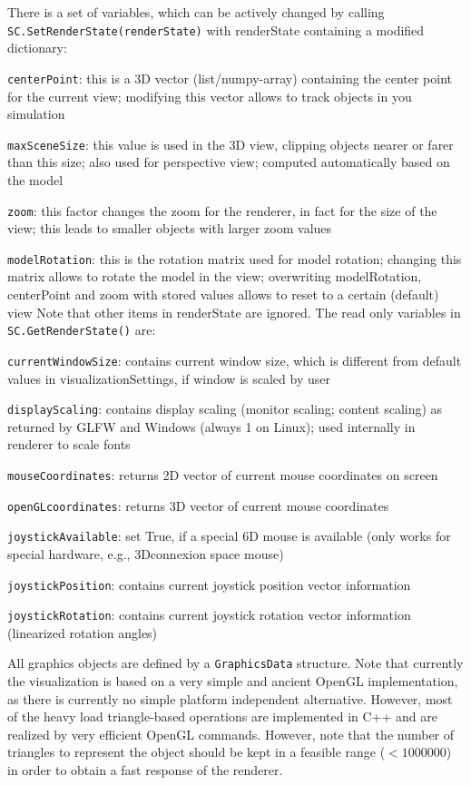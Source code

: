 There is a set of variables, which can be actively changed by calling  \texttt{SC.SetRenderState(renderState)} with renderState
containing a modified dictionary:
\bi
  \item \texttt{centerPoint}: this is a 3D vector (list/numpy-array) containing the center point for the current view; modifying this vector allows to track objects in you simulation
  \item \texttt{maxSceneSize}: this value is used in the 3D view, clipping objects nearer or farer than this size; also used for perspective view; computed automatically based on the model
  \item \texttt{zoom}: this factor changes the zoom for the renderer, in fact for the size of the view; this leads to smaller objects with larger zoom values
  \item \texttt{modelRotation}: this is the rotation matrix used for model rotation; changing this matrix allows to rotate the model in the view; overwriting modelRotation, centerPoint and zoom with stored values allows to reset to a certain (default) view
\ei
Note that other items in renderState are ignored. The read only variables in \texttt{SC.GetRenderState()} are:
\bi
  \item \texttt{currentWindowSize}: contains current window size, which is different from default values in visualizationSettings, if window is scaled by user
  \item \texttt{displayScaling}: contains display scaling (monitor scaling; content scaling) as returned by GLFW and Windows (always 1 on Linux); used internally in renderer to scale fonts
  \item \texttt{mouseCoordinates}: returns 2D vector of current mouse coordinates on screen
  \item \texttt{openGLcoordinates}: returns 3D vector of current mouse coordinates
  \item \texttt{joystickAvailable}: set True, if a special 6D mouse is available (only works for special hardware, e.g., 3Dconnexion space mouse)
  \item \texttt{joystickPosition}: contains current joystick position vector information 
  \item \texttt{joystickRotation}: contains current joystick rotation vector information (linearized rotation angles)
\ei

\newpage %
All graphics objects are defined by a \texttt{GraphicsData} structure. %
Note that currently the visualization is based on a very simple and ancient OpenGL implementation, as there is currently no simple platform independent alternative. However, most of the heavy load triangle-based operations are implemented in C++ and are realized by very efficient OpenGL commands. However, note that the number of triangles to represent the object should be kept in a feasible range ($<1000000$) in order to obtain a fast response of the renderer.

